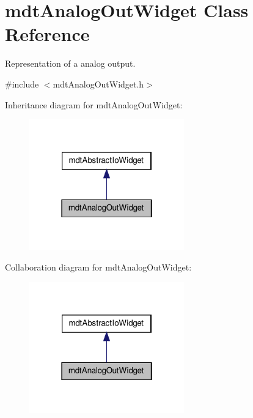 \hypertarget{classmdt_analog_out_widget}{
\section{mdtAnalogOutWidget Class Reference}
\label{classmdt_analog_out_widget}
}


Representation of a analog output.  




{\ttfamily \#include $<$mdtAnalogOutWidget.h$>$}



Inheritance diagram for mdtAnalogOutWidget:\nopagebreak
\begin{figure}[H]
\begin{center}
\leavevmode
\includegraphics[width=190pt]{classmdt_analog_out_widget__inherit__graph}
\end{center}
\end{figure}


Collaboration diagram for mdtAnalogOutWidget:\nopagebreak
\begin{figure}[H]
\begin{center}
\leavevmode
\includegraphics[width=190pt]{classmdt_analog_out_widget__coll__graph}
\end{center}
\end{figure}
